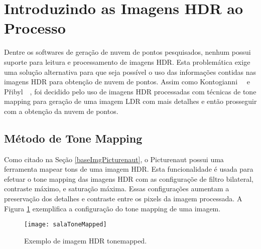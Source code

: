 \section{Introduzindo as Imagens HDR ao Processo} \label{pontosProcesso}

Dentre os softwares de geração de nuvem de pontos pesquisados, nenhum possui suporte para leitura e processamento de imagens HDR. Esta problemática exige uma solução alternativa para que seja possível o uso das informações contidas nas imagens HDR para obtenção de nuvem de pontos. Assim como Kontogianni~\etal~\cite{hdr3d} e P\v{r}ibyl~\etal~\cite{hdr3d2}, foi decidido pelo uso de imagens HDR processadas com técnicas de tone mapping para geração de uma imagem LDR com mais detalhes e então prosseguir com a obtenção da nuvem de pontos.

\subsection{Método de Tone Mapping} \label{pontosToneMapping}

Como citado na Seção \ref{baseImgPicturenaut}, o Picturenaut possui uma ferramenta mapear tons de uma imagem HDR. Esta funcionalidade é usada para efetuar o tone mapping das imagens HDR com as configuraçõe de filtro bilateral, contraste máximo, e saturação máxima. Essas configurações aumentam a preservação dos detalhes e contraste entre os pixels da imagem processada. A Figura \ref{figPontosToneMapping} exemplifica a configuração do tone mapping de uma imagem.

\begin{figure}[H]
  \centering
  \texttt{[image: salaToneMapped]}
  \caption{Exemplo de imagem HDR tonemapped.}
  \label{figPontosToneMapping}
\end{figure}